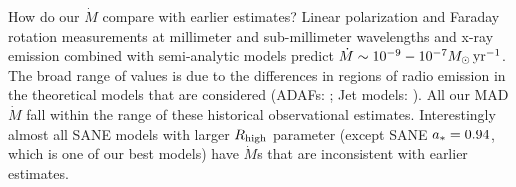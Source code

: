 

How do our $\dot{M}$ compare with earlier estimates?  Linear polarization and Faraday rotation measurements at millimeter and sub-millimeter wavelengths \citep{2000ApJ...538L.121A, 2000ApJ...545..842Q, 2003ApJ...588..331B, 2006ApJ...640..308M, 2006JPhCS..54..354M, 2006ApJ...646L.111M} and x-ray emission \citep{2003ApJ...591..891B, doi:10.1126/science.1240755} combined  with semi-analytic models predict $\dot{M} \sim 10^{-9} - 10^{-7} M_{\odot}\,\mathrm{yr}^{-1}$.  The broad range of values is due to the differences in regions of radio emission in the theoretical models that are considered (ADAFs: \citealt{1998ApJ...492..554N, Yuan_2003}; Jet models: \citealt{1993A&A...278L...1F, 2000A&A...362..113F}).  All our MAD $\dot{M}$ fall within the range of these historical observational estimates. Interestingly almost all SANE models with larger $R_\mathrm{high}$ parameter (except SANE $a_*=0.94$, which is one of our best models) have $\dot{M}$s that are inconsistent with earlier estimates.


